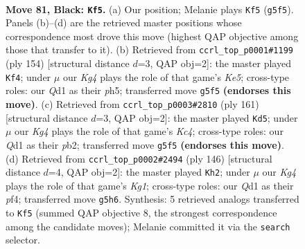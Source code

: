 \documentclass[11pt]{article}
\begin{document}
\clearpage

\begin{figure}[p]\centering
\begin{subfigure}{0.46\textwidth}\centering
\resizebox{\linewidth}{!}{%
\newchessgame
\chessboard[
  setfen={8/8/1p6/p5k1/2P5/8/K7/3q4 b - - 19 81},
  showmover=false,
  pgfstyle=straightmove, color=movearrow, markmove={g5-f5}
]}
\caption{}
\end{subfigure}\hfill
\begin{subfigure}{0.46\textwidth}\centering
\resizebox{\linewidth}{!}{%
\newchessgame
\chessboard[
  setfen={5k2/8/8/p3K2p/2P5/1P6/8/8 w - - 3 78},
  showmover=false,
  pgfstyle=straightmove, color=movearrow, markmove={e5-f4}
]}
\caption{}
\end{subfigure}
\\[4pt]
\begin{subfigure}{0.46\textwidth}\centering
\resizebox{\linewidth}{!}{%
\newchessgame
\chessboard[
  setfen={8/6p1/6Pp/2k5/8/8/1P6/6K1 b - - 14 81},
  showmover=false,
  pgfstyle=straightmove, color=movearrow, markmove={c5-d5}
]}
\caption{}
\end{subfigure}\hfill
\begin{subfigure}{0.46\textwidth}\centering
\resizebox{\linewidth}{!}{%
\newchessgame
\chessboard[
  setfen={8/8/8/3k2Pp/5p1P/8/8/6K1 w - - 12 74},
  showmover=false,
  pgfstyle=straightmove, color=movearrow, markmove={g1-h2}
]}
\caption{}
\end{subfigure}
\caption{\textbf{Move 81, Black: \texttt{Kf5}.} (a) Our position; Melanie plays \texttt{Kf5} (\texttt{g5f5}). Panels (b)--(d) are the retrieved master positions whose correspondence most drove this move (highest QAP objective among those that transfer to it). (b) Retrieved from \texttt{ccrl\_top\_p0001\#1199} (ply 154) [structural distance $d$=3, QAP obj=2]: the master played \texttt{Kf4}; under $\mu$ our \emph{Kg4} plays the role of that game's \emph{Ke5}; cross-type roles: our \emph{Q}d1 as their \emph{p}h5; transferred move \texttt{g5f5} \textbf{(endorses this move)}. (c) Retrieved from \texttt{ccrl\_top\_p0003\#2810} (ply 161) [structural distance $d$=3, QAP obj=2]: the master played \texttt{Kd5}; under $\mu$ our \emph{Kg4} plays the role of that game's \emph{Kc4}; cross-type roles: our \emph{Q}d1 as their \emph{p}b2; transferred move \texttt{g5f5} \textbf{(endorses this move)}. (d) Retrieved from \texttt{ccrl\_top\_p0002\#2494} (ply 146) [structural distance $d$=4, QAP obj=2]: the master played \texttt{Kh2}; under $\mu$ our \emph{Kg4} plays the role of that game's \emph{Kg1}; cross-type roles: our \emph{Q}d1 as their \emph{p}f4; transferred move \texttt{g5h6}. Synthesis: 5 retrieved analogs transferred to \texttt{Kf5} (summed QAP objective 8, the strongest correspondence among the candidate moves); Melanie committed it via the \texttt{search} selector.}
\label{fig:thought-m161}
\end{figure}
\end{document}
